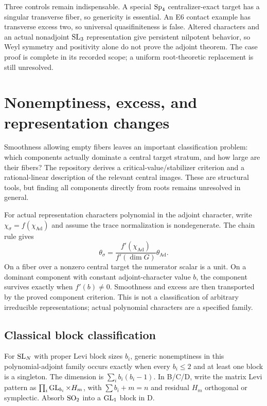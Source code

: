 Three controls remain indispensable. A special $\operatorname{Sp}_4$ centralizer-exact target has a singular transverse fiber, so genericity is essential. An E6 contact example has transverse excess two, so universal quasifiniteness is false. Altered characters and an actual nonadjoint $\operatorname{SL}_3$ representation give persistent nilpotent behavior, so Weyl symmetry and positivity alone do not prove the adjoint theorem. The case proof is complete in its recorded scope; a uniform root-theoretic replacement is still unresolved.


\section{Nonemptiness, excess, and representation changes}
Smoothness allowing empty fibers leaves an important classification problem: which components actually dominate a central target stratum, and how large are their fibers? The repository derives a critical-value/stabilizer criterion and a rational-linear description of the relevant central images. These are structural tools, but finding all components directly from roots remains unresolved in general.

For actual representation characters polynomial in the adjoint character, write $\chi_\sigma=f(\chi_{\mathrm{Ad}})$ and assume the trace normalization is nondegenerate. The chain rule gives
\[
 \theta_\sigma=
 \frac{f'(\chi_{\mathrm{Ad}})}{f'(\dim G)}\theta_{\mathrm{Ad}}.
\]
On a fiber over a nonzero central target the numerator scalar is a unit. On a dominant component with constant adjoint-character value $b$, the component survives exactly when $f'(b)\ne0$. Smoothness and excess are then transported by the proved component criterion. This is not a classification of arbitrary irreducible representations; actual polynomial characters are a specified family.

\subsection{Classical block classification}
For $\operatorname{SL}_N$ with proper Levi block sizes $b_i$, generic nonemptiness in this polynomial-adjoint family occurs exactly when every $b_i\le2$ and at least one block is a singleton. The dimension is $\sum_i b_i(b_i-1)$. In B/C/D, write the matrix Levi pattern as $\prod_i\operatorname{GL}_{b_i}\times H_m$, with $\sum b_i+m=n$ and residual $H_m$ orthogonal or symplectic. Absorb $\operatorname{SO}_2$ into a $\operatorname{GL}_1$ block in D.

